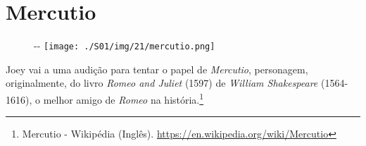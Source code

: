 \hypertarget{mercutio}{%
\section{Mercutio}\label{mercutio}}

\begin{figure}[!ht]
  \begin{adjustwidth}{-\oddsidemargin-1in}{-\rightmargin}
    \centering
    \texttt{[image: ./S01/img/21/mercutio.png]}
  \end{adjustwidth}
\end{figure}

Joey vai a uma audição para tentar o papel de \emph{Mercutio},
personagem, originalmente, do livro \emph{Romeo and Juliet} (1597) de
\emph{William Shakespeare} (1564-1616), o melhor amigo de \emph{Romeo}
na história.\footnote{\sloppy Mercutio - Wikipédia (Inglês). \url{https://en.wikipedia.org/wiki/Mercutio}}
